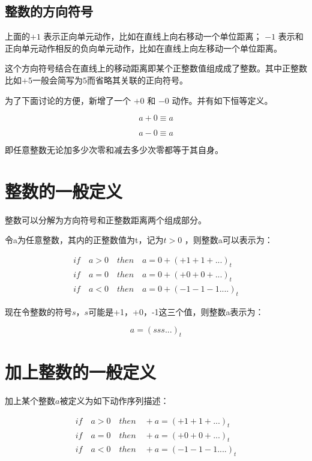 \documentclass[12pt,oneside]{book}
\begin{document}
\subsection{整数的方向符号}
上面的$+1$ 表示正向单元动作，比如在直线上向右移动一个单位距离； $-1$ 表示和正向单元动作相反的负向单元动作，比如在直线上向左移动一个单位距离。

这个方向符号结合在直线上的移动距离即某个正整数值组成成了整数。其中正整数比如$+5$一般会简写为$5$而省略其关联的正向符号。

为了下面讨论的方便，新增了一个 $+0$ 和 $-0$ 动作。并有如下恒等定义。

\begin{equation}
a +0 \equiv a
\end{equation}

\begin{equation}
a -0 \equiv a
\end{equation}

即任意整数无论加多少次零和减去多少次零都等于其自身。

\section{整数的一般定义}
整数可以分解为方向符号和正整数距离两个组成部分。

令a为任意整数，其内的正整数值为t，记为$t>0$ ，则整数a可以表示为：

\begin{align*}
if \quad a>0 \quad then \quad a=0+(+1+1+...)_t\\
if \quad a=0 \quad then \quad a=0+(+0+0+...)_t\\
if \quad a<0 \quad then \quad a=0+(-1-1-1....)_t
\end{align*}

现在令整数的符号$s$，$s$可能是+1，+0，-1这三个值，则整数a表示为：

\[
a = (sss...)_t
\]

\section{加上整数的一般定义}
加上某个整数$a$被定义为如下动作序列描述：

\begin{align*}
if \quad a>0 \quad then \quad +a=(+1+1+...)_t\\
if \quad a=0 \quad then \quad +a=(+0+0+...)_t\\
if \quad a<0 \quad then \quad +a=(-1-1-1....)_t
\end{align*}
\end{document}
